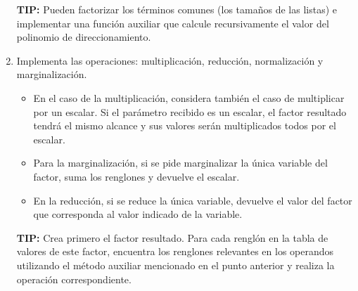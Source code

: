 \begin{enumerate}
  \textbf{TIP:} Pueden factorizar los términos comunes (los tamaños de las listas) e implementar una función auxiliar que calcule recursivamente el valor del polinomio de direccionamiento.
  
  \item Implementa las operaciones: multiplicación, reducción, normalización y marginalización.
  
  \begin{itemize}
   \item En el caso de la multiplicación, considera también el caso de multiplicar por un escalar.  Si el parámetro recibido es un escalar, el factor resultado tendrá el mismo alcance y sus valores serán multiplicados todos por el escalar.
   
   \item Para la marginalización, si se pide marginalizar la única variable del factor, suma los renglones y devuelve el escalar.
   
   \item En la reducción, si se reduce la única variable, devuelve el valor del factor que corresponda al valor indicado de la variable.
  \end{itemize}

  \textbf{TIP:} Crea primero el factor resultado. Para cada renglón en la tabla de valores de este factor, encuentra los renglones relevantes en los operandos utilizando el método auxiliar mencionado en el punto anterior y realiza la operación correspondiente.
\end{enumerate}

